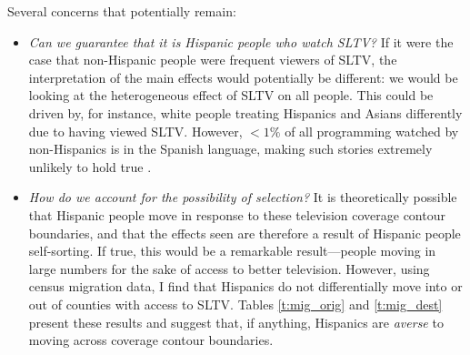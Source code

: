 \documentclass[11pt]{article}
\begin{document}
Several concerns that potentially remain:
\begin{itemize}
\item \textit{Can we guarantee that it is Hispanic people who watch SLTV?} If it were the case that non-Hispanic people were frequent viewers of SLTV, the interpretation of the main effects would potentially be different: we would be looking at the heterogeneous effect of SLTV on all people. This could be driven by, for instance, white people treating Hispanics and Asians differently due to having viewed SLTV. However,  $<1\%$ of all programming watched by non-Hispanics is in the Spanish language, making such stories extremely unlikely to hold true \cite{noauthor_hispanic_2016}.

\item \textit{How do we account for the possibility of selection?} It is theoretically possible that Hispanic people move in response to these television coverage contour boundaries, and that the effects seen are therefore a result of Hispanic people self-sorting. If true, this would be a remarkable result---people moving in large numbers for the sake of access to better television. However, using census migration data, I find that Hispanics do not differentially move into or out of counties with access to SLTV. Tables \ref{t:mig_orig} and \ref{t:mig_dest} present these results and suggest that, if anything, Hispanics are \textit{averse} to moving across coverage contour boundaries.


\end{itemize}
\end{document}
